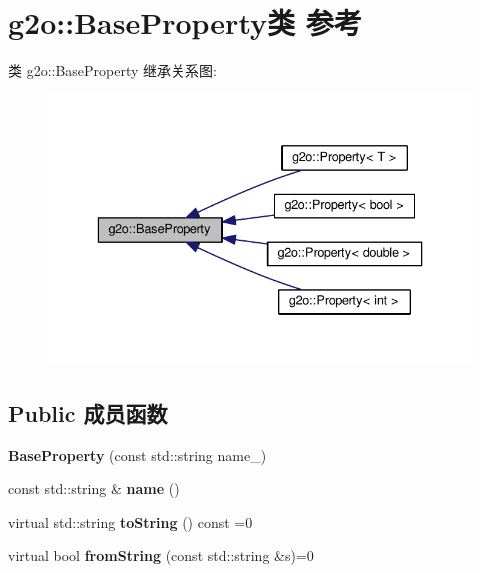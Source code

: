 \hypertarget{classg2o_1_1BaseProperty}{\section{g2o\-:\-:Base\-Property类 参考}
\label{classg2o_1_1BaseProperty}
}


类 g2o\-:\-:Base\-Property 继承关系图\-:
\nopagebreak
\begin{figure}[H]
\begin{center}
\leavevmode
\includegraphics[width=336pt]{classg2o_1_1BaseProperty__inherit__graph}
\end{center}
\end{figure}
\subsection*{Public 成员函数}
\begin{DoxyCompactItemize}
\item 
\hypertarget{classg2o_1_1BaseProperty_a00444ab7926d86beb9e66550e40e5d97}{{\bfseries Base\-Property} (const std\-::string name\-\_\-)}\label{classg2o_1_1BaseProperty_a00444ab7926d86beb9e66550e40e5d97}

\item 
\hypertarget{classg2o_1_1BaseProperty_aae91313b0eb376dd9460cd712ecbb86d}{const std\-::string \& {\bfseries name} ()}\label{classg2o_1_1BaseProperty_aae91313b0eb376dd9460cd712ecbb86d}

\item 
\hypertarget{classg2o_1_1BaseProperty_a7a4191088468c2f03dab52107d130833}{virtual std\-::string {\bfseries to\-String} () const =0}\label{classg2o_1_1BaseProperty_a7a4191088468c2f03dab52107d130833}

\item 
\hypertarget{classg2o_1_1BaseProperty_aeabc313d9f66a403738aece884c85e1d}{virtual bool {\bfseries from\-String} (const std\-::string \&s)=0}\label{classg2o_1_1BaseProperty_aeabc313d9f66a403738aece884c85e1d}

\end{DoxyCompactItemize}
